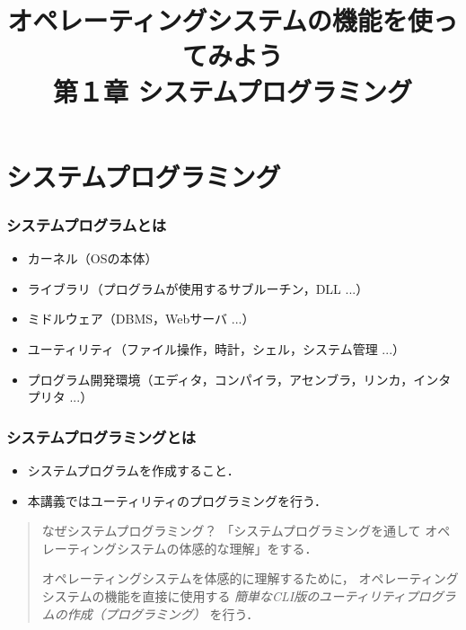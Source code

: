 \documentclass{beamer}                 %
\begin{document}
\title{オペレーティングシステムの機能を使ってみよう\\第１章 システムプログラミング}
\date{}

\begin{frame}
  \titlepage
\end{frame}


\section{システムプログラミング}
\begin{frame}
  \frametitle{システムプログラムとは}
  \begin{itemize}
  \item カーネル（OSの本体）
  \item ライブラリ（プログラムが使用するサブルーチン，DLL ...）
  \item ミドルウェア（DBMS，Webサーバ ...）
  \item ユーティリティ（ファイル操作，時計，シェル，システム管理 ...）
  \item プログラム開発環境（エディタ，コンパイラ，アセンブラ，リンカ，インタプリタ ...）
  \end{itemize}
\end{frame}

\begin{frame}
  \frametitle{システムプログラミングとは}
  \begin{itemize}
  \item システムプログラムを作成すること．
  \item 本講義ではユーティリティのプログラミングを行う．
  \end{itemize}
  \vfill
  \begin{quote}
    {\Large
      \begin{itembox}[l]{なぜシステムプログラミング？}
        「システムプログラミングを通して
          オペレーティングシステムの体感的な理解」をする．
        \end{itembox}
      }
      \vfil
      オペレーティングシステムを体感的に理解するために，
      オペレーティングシステムの機能を直接に使用する
      \emph{簡単なCLI版のユーティリティプログラムの作成（プログラミング）}
      を行う．
  \end{quote}
\end{frame}
\end{document}
